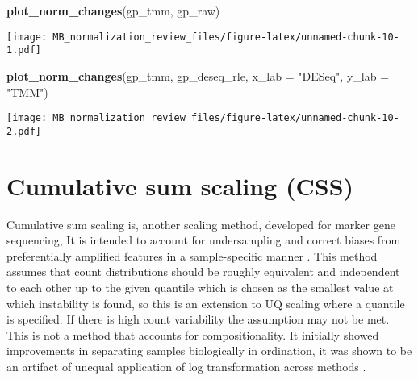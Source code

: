 \documentclass[
]{book}
\newenvironment{Shaded}{\begin{snugshade}}{\end{snugshade}}
\newcommand{\DataTypeTok}[1]{\textcolor[rgb]{0.13,0.29,0.53}{#1}}
\newcommand{\KeywordTok}[1]{\textcolor[rgb]{0.13,0.29,0.53}{\textbf{#1}}}
\newcommand{\NormalTok}[1]{#1}
\newcommand{\StringTok}[1]{\textcolor[rgb]{0.31,0.60,0.02}{#1}}
\begin{document}
\begin{Shaded}
\begin{Highlighting}[]
\KeywordTok{plot\_norm\_changes}\NormalTok{(gp\_tmm, gp\_raw)}
\end{Highlighting}
\end{Shaded}

\texttt{[image: MB\_normalization\_review\_files/figure-latex/unnamed-chunk-10-1.pdf]}

\begin{Shaded}
\begin{Highlighting}[]
\KeywordTok{plot\_norm\_changes}\NormalTok{(gp\_tmm, gp\_deseq\_rle, }\DataTypeTok{x\_lab =} \StringTok{"DESeq"}\NormalTok{, }\DataTypeTok{y\_lab =} \StringTok{"TMM"}\NormalTok{)}
\end{Highlighting}
\end{Shaded}

\texttt{[image: MB\_normalization\_review\_files/figure-latex/unnamed-chunk-10-2.pdf]}

\hypertarget{cumulative-sum-scaling-css}{%
\chapter{Cumulative sum scaling (CSS)}\label{cumulative-sum-scaling-css}}

Cumulative sum scaling is, another scaling method, developed for marker gene sequencing, It is intended to account for undersampling and correct biases from preferentially amplified features in a sample-specific manner \citep{paulson2013}. This method assumes that count distributions should be roughly equivalent and independent to each other up to the given quantile which is chosen as the smallest value at which instability is found, so this is an extension to UQ scaling where a quantile is specified. If there is high count variability the assumption may not be met. This is not a method that accounts for compositionality. It initially showed improvements in separating samples biologically in ordination, it was shown to be an artifact of unequal application of log transformation across methods \citep{costea2014}.
\end{document}
